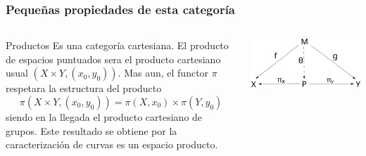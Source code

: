 \documentclass[xetex,mathserif,serif]{beamer}
\begin{document}
  \begin{frame}
    \frametitle{Pequeñas propiedades de esta categoría}
    \begin{columns}
      \begin{column}{0.6\textwidth}
        \begin{block}{Productos}
          Es una categoría cartesiana. El producto de espacios puntuados
          sera el producto cartesiano usual \((X \times Y, (x_0, y_0))\).
          Mas aun, el functor \(\pi\) respetara la estructura del
          producto
          \[ \pi (X \times Y , (x_0, y_0)) = \pi (X, x_0) \times \pi (Y,
            y_0)\]
          siendo en la llegada el producto cartesiano de
          grupos. Este resultado se obtiene por la caracterización de
          curvas es un espacio producto.
        \end{block}
      \end{column}
      \begin{column}{0.4\textwidth}
        \begin{center}
          \includegraphics[scale=0.32]{../tesis/imagenes/producto.png}
        \end{center}
      \end{column}
    \end{columns}
  \end{frame}
\end{document}
